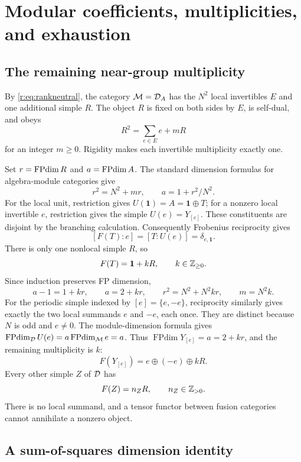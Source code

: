 \documentclass[11pt,a4paper]{article}
\numberwithin{equation}{section}
\theoremstyle{definition}\newtheorem{definition}[theorem]{Definition}
\theoremstyle{remark}\newtheorem{remark}[theorem]{Remark}
\newcommand{\one}{\mathbf1}\newcommand{\B}{\mathcal B}\newcommand{\W}{W_N}
\newcommand{\Mod}{\mathcal M}\newcommand{\HI}{\mathcal H}
\begin{document}
\section{Modular coefficients, multiplicities, and exhaustion}
\label{r:sec:budget}

\subsection{The remaining near-group multiplicity}

By \eqref{r:eq:rankneutral}, the category \(\Mod=\Neu_A\) has the
\(N^2\) local invertibles \(E\) and one additional simple \(R\).
The object \(R\) is fixed on both sides by \(E\), is self-dual,
and obeys
\[
                        R^2=\sum_{e\in E}e+mR
\]
for an integer \(m\ge0\). Rigidity makes each invertible
multiplicity exactly one.

Set \(r=\operatorname{FPdim} R\) and \(a=\operatorname{FPdim} A\). The standard dimension
formulas for algebra-module categories give
\[
 r^2=N^2+mr,\qquad a=1+r^2/N^2.
\]
For the local unit, restriction gives $U(\one)=A=\one\oplus T$;
for a nonzero local invertible $e$, restriction gives the simple
$U(e)=Y_{[e]}$. These constituents are disjoint by the branching
calculation. Consequently Frobenius reciprocity gives
\[
 [F(T):e]=[T:U(e)]=\delta_{e,\one}.
\]
There is only one nonlocal simple $R$, so
\[
 F(T)=\one+kR,\qquad k\in\NN.
\]
Since induction preserves FP dimension,
\[
 a-1=1+kr,\qquad a=2+kr,\qquad
 r^2=N^2+N^2kr,\qquad m=N^2k.
\]
For the periodic simple indexed by \([e]=\{e,-e\}\), reciprocity
similarly gives exactly the two local summands $e$ and $-e$, each
once. They are distinct because $N$ is odd and $e\ne0$.
The module-dimension formula gives
$\operatorname{FPdim}_{\Neu}U(e)=a\operatorname{FPdim}_{\Mod}e=a$.
Thus $\operatorname{FPdim}Y_{[e]}=a=2+kr$, and the remaining
multiplicity is $k$:
\begin{equation}\label{r:eq:induction}
 F(Y_{[e]})=e\oplus(-e)\oplus kR.
\end{equation}
Every other simple \(Z\) of \(\mathcal D\) has
\begin{equation}\label{r:eq:otherind}
                            F(Z)=n_ZR,\qquad n_Z\in\mathbb Z_{>0}.
\end{equation}
There is no local summand, and a tensor functor between fusion
categories cannot annihilate a nonzero object.

\subsection{A sum-of-squares dimension identity}
\end{document}
